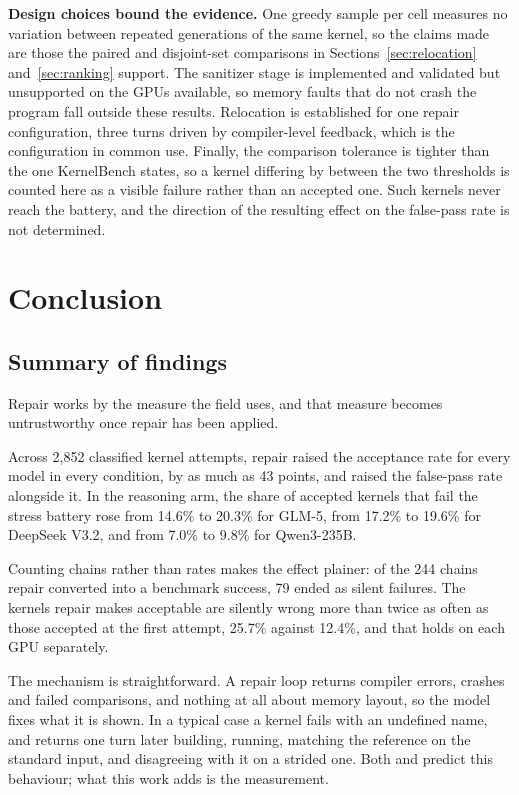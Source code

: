 \documentclass[12pt]{article}
\begin{document}
\textbf{Design choices bound the evidence.} One greedy sample per cell measures
no variation between repeated generations of the same kernel, so the claims
made are those the paired and disjoint-set comparisons in
Sections~\ref{sec:relocation} and~\ref{sec:ranking} support. The sanitizer
stage is implemented and validated but unsupported on the GPUs available, so
memory faults that do not crash the program fall outside these results.
Relocation is established for one repair configuration, three turns driven by
compiler-level feedback, which is the configuration in common use. Finally, the
comparison tolerance is tighter than the one KernelBench states, so a kernel
differing by between the two thresholds is counted here as a visible failure
rather than an accepted one. Such kernels never reach the battery, and the
direction of the resulting effect on the false-pass rate is not determined.

\section{Conclusion}

\subsection{Summary of findings}

Repair works by the measure the field uses, and that measure becomes
untrustworthy once repair has been applied.

Across 2{,}852 classified kernel attempts, repair raised the acceptance rate for
every model in every condition, by as much as 43 points, and raised the
false-pass rate alongside it. In the reasoning arm, the share of accepted
kernels that fail the stress battery rose from 14.6\% to 20.3\% for GLM-5, from
17.2\% to 19.6\% for DeepSeek V3.2, and from 7.0\% to 9.8\% for Qwen3-235B.

Counting chains rather than rates makes the effect plainer: of the 244 chains
repair converted into a benchmark success, 79 ended as silent failures. The
kernels repair makes acceptable are silently wrong more than twice as often as
those accepted at the first attempt, 25.7\% against 12.4\%, and that holds on
each GPU separately.

The mechanism is straightforward. A repair loop returns compiler errors,
crashes and failed comparisons, and nothing at all about memory layout, so the
model fixes what it is shown. In a typical case a kernel fails with
an undefined name, and returns one turn later building, running, matching the
reference on the standard input, and disagreeing with it on a strided one. Both
\citet{olausson2024selfrepair} and \citet{huang2024cannot} predict this
behaviour; what this work adds is the measurement.
\end{document}
